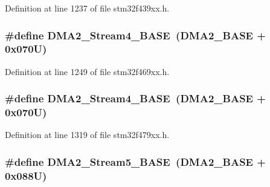 Definition at line 1237 of file stm32f439xx.\+h.

\subsubsection[{\texorpdfstring{D\+M\+A2\+\_\+\+Stream4\+\_\+\+B\+A\+SE}{DMA2_Stream4_BASE}}]{\setlength{\rightskip}{0pt plus 5cm}\#define D\+M\+A2\+\_\+\+Stream4\+\_\+\+B\+A\+SE~({\bf D\+M\+A2\+\_\+\+B\+A\+SE} + 0x070\+U)}\hypertarget{group___peripheral__memory__map_gad1e67740e6301233473f64638145dd1f}{}\label{group___peripheral__memory__map_gad1e67740e6301233473f64638145dd1f}


Definition at line 1249 of file stm32f469xx.\+h.

\subsubsection[{\texorpdfstring{D\+M\+A2\+\_\+\+Stream4\+\_\+\+B\+A\+SE}{DMA2_Stream4_BASE}}]{\setlength{\rightskip}{0pt plus 5cm}\#define D\+M\+A2\+\_\+\+Stream4\+\_\+\+B\+A\+SE~({\bf D\+M\+A2\+\_\+\+B\+A\+SE} + 0x070\+U)}\hypertarget{group___peripheral__memory__map_gad1e67740e6301233473f64638145dd1f}{}\label{group___peripheral__memory__map_gad1e67740e6301233473f64638145dd1f}


Definition at line 1319 of file stm32f479xx.\+h.

\subsubsection[{\texorpdfstring{D\+M\+A2\+\_\+\+Stream5\+\_\+\+B\+A\+SE}{DMA2_Stream5_BASE}}]{\setlength{\rightskip}{0pt plus 5cm}\#define D\+M\+A2\+\_\+\+Stream5\+\_\+\+B\+A\+SE~({\bf D\+M\+A2\+\_\+\+B\+A\+SE} + 0x088\+U)}\hypertarget{group___peripheral__memory__map_gaed1460fdc407b6decfbffccb0260d0af}{}\label{group___peripheral__memory__map_gaed1460fdc407b6decfbffccb0260d0af}



